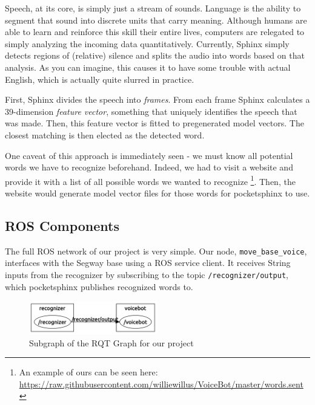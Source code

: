 \documentclass{article}
\begin{document}
\vspace{5mm}

\noindent Speech, at its core, is simply just a stream of sounds. Language is the ability to segment that sound into discrete units that carry meaning. Although humans are able to learn and reinforce this skill their entire lives, computers are relegated to simply analyzing the incoming data quantitatively. Currently, Sphinx simply detects regions of (relative) silence and splits the audio into words based on that analysis. As you can imagine, this causes it to have some trouble with actual English, which is actually quite slurred in practice.\par

\vspace{5mm}

\noindent First, Sphinx divides the speech into \textit{frames}. From each frame Sphinx calculates a 39-dimension \textit{feature vector}, something that uniquely identifies the speech that was made. Then, this feature vector is fitted to pregenerated model vectors. The closest matching is then elected as the detected word.\par

\noindent One caveat of this approach is immediately seen - we must know all potential words we have to recognize beforehand. Indeed, we had to visit a website and provide it with a list of all possible words we wanted to recognize \footnote{An example of ours can be seen here: \url{https://raw.githubusercontent.com/williewillus/VoiceBot/master/words.sent}}. Then, the website would generate model vector files for those words for pocketsphinx to use.

\subsection{ROS Components}
The full ROS network of our project is very simple. Our node, \texttt{move\_base\_voice}, interfaces with the Segway base using a ROS service client. It receives String inputs from the recognizer by subscribing to the topic \texttt{/recognizer/output}, which pocketsphinx publishes recognized words to.

\begin{figure}[h]
\caption{Subgraph of the RQT Graph for our project}
\centering
\includegraphics[width=0.5\textwidth]{graph}
\end{figure}
\end{document}
